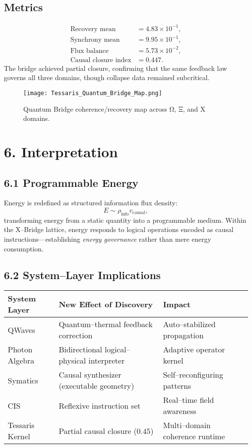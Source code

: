 \documentclass[11pt,a4paper]{article}
\begin{document}
\subsection*{Metrics}
\begin{align*}
\text{Recovery mean} &= 4.83\times10^{-1},\\
\text{Synchrony mean} &= 9.95\times10^{-1},\\
\text{Flux balance} &= 5.73\times10^{-2},\\
\text{Causal closure index} &= 0.447.
\end{align*}
The bridge achieved partial closure, confirming that the same feedback law governs all three domains, though collapse data remained subcritical.

\begin{figure}[h!]
\centering
\texttt{[image: Tessaris\_Quantum\_Bridge\_Map.png]}
\caption{Quantum Bridge coherence/recovery map across Ω, Ξ, and X domains.}
\end{figure}

\section{6. Interpretation}
\subsection*{6.1 Programmable Energy}
Energy is redefined as structured information flux density:
\[
E \sim \rho_{\text{info}} v_{\text{causal}},
\]
transforming energy from a static quantity into a programmable medium.  
Within the X–Bridge lattice, energy responds to logical operations encoded as causal instructions—establishing \emph{energy governance} rather than mere energy consumption.

\subsection*{6.2 System–Layer Implications}
\begin{longtable}{|l|l|l|}
\hline
\textbf{System Layer} & \textbf{New Effect of Discovery} & \textbf{Impact} \\
\hline
QWaves & Quantum–thermal feedback correction & Auto--stabilized propagation \\
Photon Algebra & Bidirectional logical–physical interpreter & Adaptive operator kernel \\
Symatics & Causal synthesizer (executable geometry) & Self--reconfiguring patterns \\
CIS & Reflexive instruction set & Real--time field awareness \\
Tessaris Kernel & Partial causal closure ($0.45$) & Multi--domain coherence runtime \\
\hline
\end{longtable}
\end{document}
